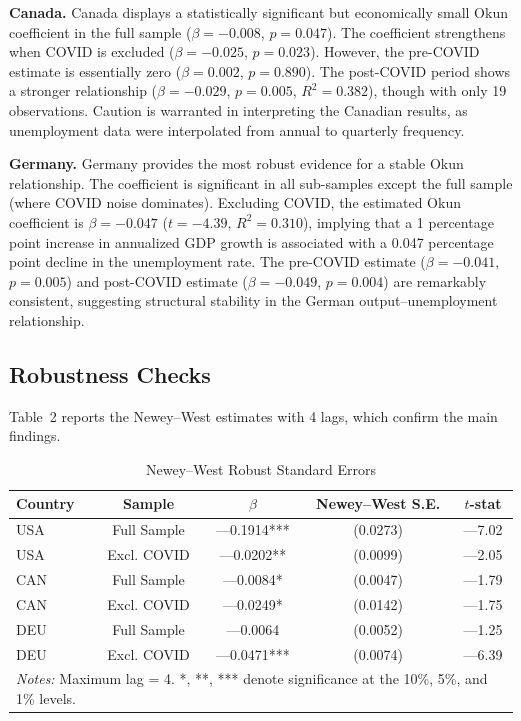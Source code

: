 \documentclass[12pt,a4paper]{article}
\begin{document}
\textbf{Canada.} Canada displays a statistically significant but economically small Okun coefficient in the full sample ($\beta = -0.008$, $p = 0.047$). The coefficient strengthens when COVID is excluded ($\beta = -0.025$, $p = 0.023$). However, the pre-COVID estimate is essentially zero ($\beta = 0.002$, $p = 0.890$). The post-COVID period shows a stronger relationship ($\beta = -0.029$, $p = 0.005$, $R^2 = 0.382$), though with only 19 observations. Caution is warranted in interpreting the Canadian results, as unemployment data were interpolated from annual to quarterly frequency.

\textbf{Germany.} Germany provides the most robust evidence for a stable Okun relationship. The coefficient is significant in all sub-samples except the full sample (where COVID noise dominates). Excluding COVID, the estimated Okun coefficient is $\beta = -0.047$ ($t = -4.39$, $R^2 = 0.310$), implying that a 1 percentage point increase in annualized GDP growth is associated with a 0.047 percentage point decline in the unemployment rate. The pre-COVID estimate ($\beta = -0.041$, $p = 0.005$) and post-COVID estimate ($\beta = -0.049$, $p = 0.004$) are remarkably consistent, suggesting structural stability in the German output--unemployment relationship.

\subsection{Robustness Checks}

Table~2 reports the Newey--West estimates with 4 lags, which confirm the main findings.

\begin{table}[H]
\centering
\caption{Newey--West Robust Standard Errors}
\label{tab:newey}
\begin{tabular}{lcccc}
\toprule
Country & Sample & $\beta$ & Newey--West S.E. & $t$-stat \\
\midrule
USA & Full Sample & ---0.1914*** & (0.0273) & ---7.02 \\
USA & Excl. COVID & ---0.0202** & (0.0099) & ---2.05 \\
CAN & Full Sample & ---0.0084* & (0.0047) & ---1.79 \\
CAN & Excl. COVID & ---0.0249* & (0.0142) & ---1.75 \\
DEU & Full Sample & ---0.0064 & (0.0052) & ---1.25 \\
DEU & Excl. COVID & ---0.0471*** & (0.0074) & ---6.39 \\
\bottomrule
\multicolumn{5}{l}{\textit{Notes:} Maximum lag = 4. *, **, *** denote significance at the 10\%, 5\%, and 1\% levels.}
\end{tabular}
\end{table}
\end{document}
